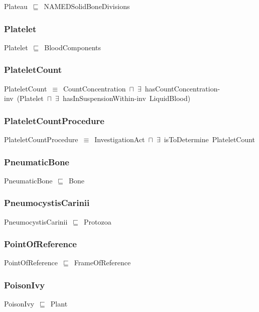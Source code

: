 \documentclass{article}
\begin{document}
Plateau~\ensuremath{\sqsubseteq}~NAMEDSolidBoneDivisions~

\subsubsection*{Platelet}

Platelet~\ensuremath{\sqsubseteq}~BloodComponents~

\subsubsection*{PlateletCount}

PlateletCount~\ensuremath{\equiv}~CountConcentration~\ensuremath{\sqcap}~\ensuremath{\exists}~hasCountConcentration-inv~(Platelet~\ensuremath{\sqcap}~\ensuremath{\exists}~hasInSuspensionWithin-inv~LiquidBlood)

\subsubsection*{PlateletCountProcedure}

PlateletCountProcedure~\ensuremath{\equiv}~InvestigationAct~\ensuremath{\sqcap}~\ensuremath{\exists}~isToDetermine~PlateletCount

\subsubsection*{PneumaticBone}

PneumaticBone~\ensuremath{\sqsubseteq}~Bone~

\subsubsection*{PneumocystisCarinii}

PneumocystisCarinii~\ensuremath{\sqsubseteq}~Protozoa~

\subsubsection*{PointOfReference}

PointOfReference~\ensuremath{\sqsubseteq}~FrameOfReference~

\subsubsection*{PoisonIvy}

PoisonIvy~\ensuremath{\sqsubseteq}~Plant~
\end{document}

